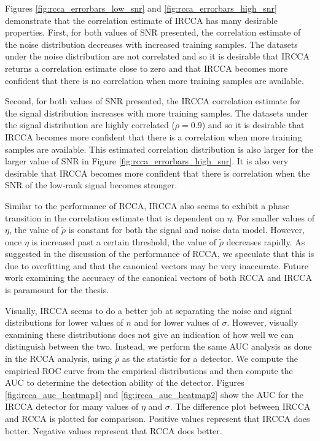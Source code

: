 Figures \ref{fig:rcca_errorbars_low_snr} and \ref{fig:rcca_errorbars_high_snr} demonstrate
that the correlation estimate of IRCCA has many desirable properties. First, for both
values of SNR presented, the correlation estimate of the noise distribution decreases with
increased training samples. The datasets under the noise distribution are not correlated
and so it is desirable that IRCCA returns a correlation estimate close to zero and that
IRCCA becomes more confident that there is no correlation when more training samples are
available. 

Second, for both values of SNR presented, the IRCCA correlation estimate for the signal
distribution increases with more training samples. The datasets under the signal
distribution are highly correlated ($\rho=0.9$) and so it is desirable that IRCCA becomes
more confident that there is a correlation when more training samples are available. This
estimated correlation distribution is also larger for the larger value of SNR in
Figure \ref{fig:rcca_errorbars_high_snr}. It is also very desirable that IRCCA becomes more
confident that there is correlation when the SNR of the low-rank signal becomes stronger. 

Similar to the performance of RCCA, IRCCA also seems to exhibit a phase transition in the
correlation estimate that is dependent on $\eta$. For smaller values of $\eta$, the value
of $\widetilde{\rho}$ is constant for both the signal and noise data model. However, once
$\eta$ is increased past a certain threshold, the value of $\widetilde{\rho}$ decreases
rapidly. As suggested in the discussion of the performance of RCCA, we speculate that this
is due to overfitting and that the canonical vectors may be very inaccurate. Future work
examining the accuracy of the canonical vectors of both RCCA and IRCCA is paramount for
the thesis.

Visually, IRCCA seems to do a better job at separating the noise and signal distributions
for lower values of $n$ and for lower values of $\sigma$. However, visually examining
these distributions does not give an indication of how well we can distinguish between the
two. Instead, we perform the same AUC analysis as done in the RCCA analysis, using
$\widetilde{\rho}$ as the statistic for a \naive detector. We compute the empirical ROC
curve from the empirical distributions and then compute the AUC to determine the detection
ability of the detector. Figures \ref{fig:ircca_auc_heatmap1} and
\ref{fig:ircca_auc_heatmap2} show the AUC for the IRCCA detector for many values of $\eta$
and $\sigma$. The difference plot between IRCCA and RCCA is plotted for
comparison. Positive values represent that IRCCA does better. Negative values represent
that RCCA does better.

